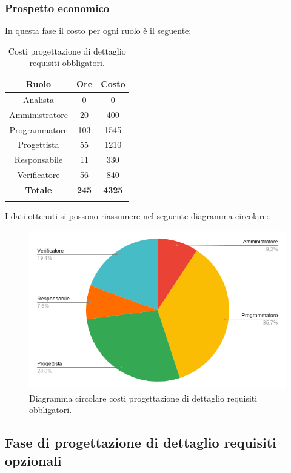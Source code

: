 \subsubsection{Prospetto economico}

In questa fase il costo per ogni ruolo è il seguente:
\begin{longtable}{|c|c|c|}
	\hline
	\rowcolor[HTML]{F9CB9C} 
	\textbf{Ruolo} & \textbf{Ore} & \textbf{Costo} \\
	\hline
	Analista & 
	0 & 
	0 \\
	\hline
	Amministratore &
	20 &
	400 \\
	\hline
	Programmatore &
	103 &
	1545 \\
	\hline
	Progettista &
	55 &
	1210 \\
	\hline
	Responsabile & 
	11 &
	330 \\
	\hline
	Verificatore &
	56 &
	840 \\
	\hline
	\rowcolor[HTML]{F9CB9C} 
	\textbf{Totale} & \textbf{245} & \textbf{4325} \\
	\hline
	\caption{Costi progettazione di dettaglio requisiti obbligatori.}
	\label{fig: Costi progettazione di dettaglio requisiti obbligatori.}
\end{longtable}

I dati ottenuti si possono riassumere nel seguente diagramma circolare:
\begin{figure}[H]
	\centering
	\includegraphics[width=0.6\linewidth]{./res/images/CostiObbligatori.png}
	\caption{Diagramma circolare costi progettazione di dettaglio requisiti obbligatori.}
	\label{fig: Diagramma circolare costi progettazione di dettaglio requisiti obbligatori.}
\end{figure}


%
%
%
%
\subsection{Fase di progettazione di dettaglio requisiti opzionali }

